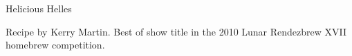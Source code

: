 \begin{recipe}{Helicious Helles}

\begin{aboutblock}
Recipe by Kerry Martin. Best of show title in the 2010 Lunar Rendezbrew XVII
homebrew competition. 
\end{aboutblock}


\begin{methodandtiming}
 
\begin{mashsteps}
\end{mashsteps}

\begin{fermentationsteps}
\end{fermentationsteps}

\end{methodandtiming}

\recipebreak

\begin{ingredientsblock}

\begin{malts}
\end{malts}

\begin{hops}
\end{hops}


\end{ingredientsblock}

\end{recipe}

